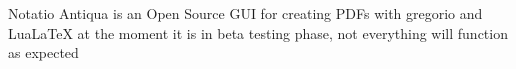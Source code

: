 \-Notatio \-Antiqua is an \-Open \-Source \-G\-U\-I for creating \-P\-D\-Fs with gregorio and \-Lua\-La\-Te\-X at the moment it is in beta testing phase, not everything will function as expected 